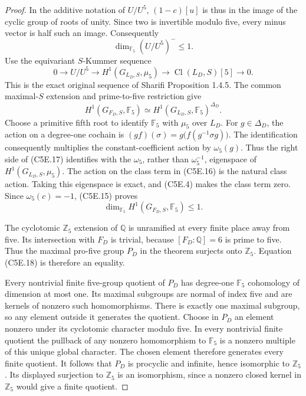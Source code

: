 \begin{proof}
In the additive notation of $U/U^5$,
$(1-c)[u]$ is thus in the image of the cyclic group of roots
of unity.  Since two is invertible modulo five, every
minus vector is half such an image.  Consequently
\[
                       \dim_{\mathbb F_5}(U/U^5)^-\leq1.
 \tag{C5E.15}
\]
Use the equivariant $S$-Kummer sequence
\[
 0\longrightarrow U/U^5\longrightarrow H^1(G_{L_D,S},\mu_5)
                    \longrightarrow\operatorname{Cl}(L_D,S)[5]
                    \longrightarrow0.
 \tag{C5E.16}
\]
This is the exact original sequence of Sharifi Proposition 1.4.5.
The common maximal-$S$ extension and prime-to-five restriction
give
\[
 H^1(G_{F_D,S},\mathbb F_5)
             \simeq H^1(G_{L_D,S},\mathbb F_5)^{\Delta_D}.
 \tag{C5E.17}
\]
Choose a primitive fifth root to identify $\mathbb F_5$ with
$\mu_5$ over $L_D$.  For $g\in\Delta_D$, the action on a
degree-one cochain is
$(g f)(\sigma)=g\bigl(f(g^{-1}\sigma g)\bigr)$.
The identification consequently multiplies the constant-coefficient
action by $\omega_5(g)$.  Thus the right side of (C5E.17)
identifies with the $\omega_5$, rather than $\omega_5^{-1}$,
eigenspace of $H^1(G_{L_D,S},\mu_5)$.
The action on the class term in (C5E.16) is the natural class action.
Taking this eigenspace is exact, and (C5E.4) makes the class
term zero.  Since $\omega_5(c)=-1$, (C5E.15) proves
\[
                    \dim_{\mathbb F_5}H^1(G_{F_D,S},\mathbb F_5)\leq1.
 \tag{C5E.18}
\]

The cyclotomic $\mathbb Z_5$ extension of $\mathbb Q$ is
unramified at every finite place away from five.  Its
intersection with $F_D$ is trivial, because $[F_D:\mathbb Q]=6$
is prime to five.  Thus the maximal pro-five group $P_D$
in the theorem surjects onto $\mathbb Z_5$.
Equation (C5E.18) is therefore an equality.

Every nontrivial finite five-group quotient of $P_D$ has
degree-one $\mathbb F_5$ cohomology of dimension at most one.
Its maximal subgroups are normal of index five and are kernels
of nonzero such homomorphisms.  There is exactly one maximal
subgroup, so any element outside it generates the quotient.
Choose in $P_D$ an element nonzero under its cyclotomic
character modulo five.  In every nontrivial finite quotient
the pullback of any nonzero homomorphism to $\mathbb F_5$
is a nonzero multiple of this unique global character.
The chosen element therefore generates every finite quotient.
It follows that $P_D$ is procyclic and infinite, hence isomorphic
to $\mathbb Z_5$.  Its displayed surjection to $\mathbb Z_5$
is an isomorphism, since a nonzero closed kernel in
$\mathbb Z_5$ would give a finite quotient.


\end{proof}
